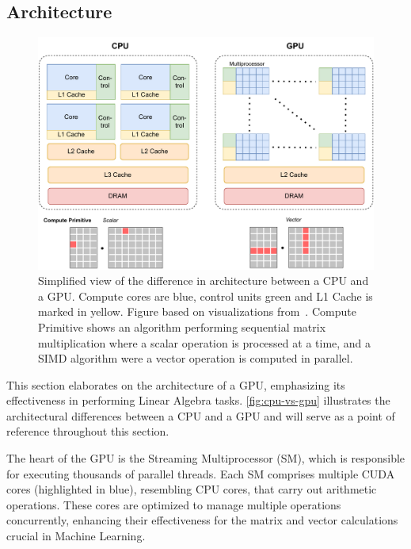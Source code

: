 \subsection{Architecture}
\label{subsec:gpu-architecture}

\begin{figure}[ht]
  \includegraphics[width=.95\linewidth]{chapters/02_preliminaries/figures/CPU-vs-GPU.pdf}
  \caption[Simplified view of the difference in architecture between a CPU and a GPU.]{ Simplified view of the difference in architecture between a CPU and a GPU. Compute cores are blue, control units green and L1 Cache is marked in yellow. Figure based on visualizations from~\cite{gpu-in-ml-survey, cuda-programming-guide, tvm}. Compute Primitive shows an algorithm performing sequential matrix multiplication where a scalar operation is processed at a time, and a SIMD algorithm were a vector operation is computed in parallel.}
  \label{fig:cpu-vs-gpu}
\end{figure}
This section elaborates on the architecture of a GPU, emphasizing its effectiveness in performing Linear Algebra tasks. \autoref{fig:cpu-vs-gpu} illustrates the architectural differences between a CPU and a GPU and will serve as a point of reference throughout this section.

The heart of the GPU is the Streaming Multiprocessor (SM), which is responsible for executing thousands of parallel threads. Each SM comprises multiple CUDA cores (highlighted in blue), resembling CPU cores, that carry out arithmetic operations. These cores are optimized to manage multiple operations concurrently, enhancing their effectiveness for the matrix and vector calculations crucial in Machine Learning.

